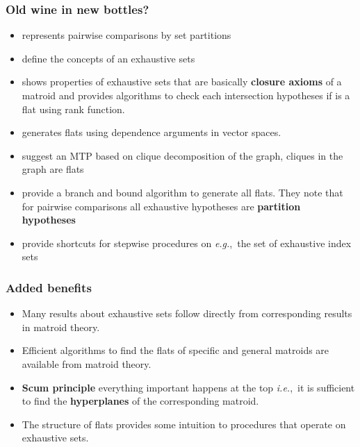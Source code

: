 \documentclass[bigger]{beamer}
\newcommand{\ie}{{\sl i.e.},~}
\newcommand{\eg}{{\sl e.g.},~}
\providecommand{\alert}[1]{\textbf{#1}}
\begin{document}
\begin{frame}
\frametitle{Old wine in new bottles?}

\begin{itemize}
\item \cite{shaffer1986modified} represents pairwise comparisons
 by set partitions
\item \cite{bergmann1988improvements} define the concepts of an
 exhaustive sets
\item \cite{bernhard1991computergestuetzte} shows properties of
 exhaustive sets that are basically \alert{closure axioms} of a matroid
 and provides algorithms to check each intersection hypotheses if is
 a flat using rank function.
\item \cite{westfall1997multiple} generates flats using dependence
 arguments in vector spaces.
\item \cite{weichert2000robuste} suggest an MTP based on clique
 decomposition of the graph, cliques in the graph are flats
\item \cite{westfall2007multiple} provide a branch and bound algorithm
 to generate all flats. They note that for pairwise comparisons all
 exhaustive hypotheses are \alert{partition hypotheses}
\item \cite{brannath2010shortcuts} provide shortcuts for stepwise
  procedures on \eg the set of exhaustive index sets
\end{itemize}
\end{frame}

\begin{frame}
\frametitle{Added benefits}
 \begin{itemize}
 \item Many results about exhaustive sets follow directly from
   corresponding results in matroid theory.
 \item Efficient algorithms to find the flats of specific and general
   matroids are available from matroid theory.
 \item \alert{Scum principle} \cite{welsh2010matroid} everything
   important happens at the top \ie it is sufficient to find the
   \alert{hyperplanes} of the corresponding matroid.
 \item The structure of flats provides some intuition to procedures
   that operate on exhaustive sets. 
 \end{itemize}
\end{frame}
\end{document}
